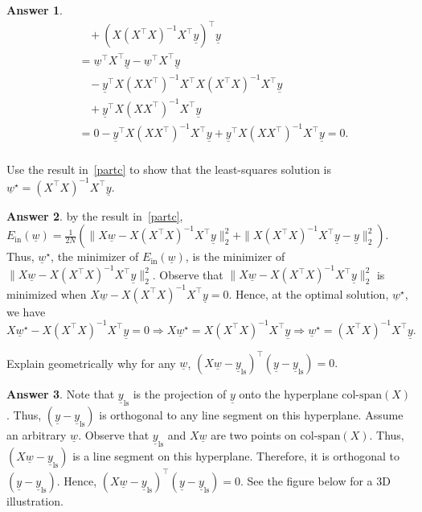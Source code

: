 \documentclass{article}
\renewcommand{\vec}[1]{\underline{#1}}
\newcommand{\vecw}{\vec{w}}
\newcommand{\vecy}{\vec{y}}
\theoremstyle{definition}
\newtheorem*{answer}{Answer}
\begin{document}
\begin{question}[start=0]
\begin{question}
\begin{answer}
\begin{align*}
				&~~~~ + (X (X^\top X)^{-1} X^\top \vecy)^\top \underline{y}\\
				&= \underline{w}^\top X^\top \underline{y} - \underline{w}^\top X^\top \underline{y} \\
				&~~~~ - \vecy^\top X (X X^\top)^{-1} X^\top  X (X^\top X)^{-1} X^\top \vecy\\
				&~~~~ + \vecy^\top X (X X^\top)^{-1} X^\top  \underline{y}\\
				&= 0  - \vecy^\top X (X X^\top)^{-1} X^\top \vecy  + \vecy^\top X (X X^\top)^{-1} X^\top  \underline{y}=0.\\
			\end{align*}
		\end{answer}
	\item Use the result in~\ref{partc} to show that the least-squares solution is $\vecw^\star = (X^\top X)^{-1} X^\top \vecy$. 
	\begin{answer}
		by the result in~\ref{partc}, $E_{\text{in}}(\vecw) = \frac{1}{2N} \left(\|X \underline{w} - X (X^\top X)^{-1} X^\top \vecy\|_{2}^2 + \|X (X^\top X)^{-1} X^\top \vecy - \underline{y}\|_{2}^2\right)$. Thus, $\underline{w}^\star$, the minimizer of $E_{\text{in}}(\vecw)$, is the minimizer of $\|X \underline{w} - X (X^\top X)^{-1} X^\top \vecy\|_{2}^2$. Observe that $\|X \underline{w} - X (X^\top X)^{-1} X^\top \vecy\|_{2}^2$ is minimized when $X \underline{w} - X (X^\top X)^{-1} X^\top \vecy=0$. Hence, at the optimal solution, $\underline{w}^\star$, we have
		\begin{equation*}
			X \underline{w}^\star - X (X^\top X)^{-1} X^\top \vecy = 0 \Rightarrow X \underline{w}^\star = X (X^\top X)^{-1} X^\top \vecy \Rightarrow \underline{w}^\star = (X^\top X)^{-1} X^\top \vecy.
		\end{equation*}
	\end{answer}
	\item Explain geometrically why for any $\underline{w}$, $(X \vecw - \vecy_{\text{ls}})^\top (\vecy - \vecy_{\text{ls}}) = 0.$
	\begin{answer}
		Note that $\vecy_{\text{ls}}$ is the projection of $\vecy$ onto the hyperplane $\text{col-span}{(X)}$. Thus, $(\vecy - \vecy_{\text{ls}})$ is orthogonal to any line segment on this hyperplane. Assume an arbitrary $\vecw$. Observe that $\vecy_{\text{ls}}$ and $X \vecw$ are two points on $\text{col-span}{(X)}$. Thus, $(X \vecw - \vecy_{\text{ls}})$ is a line segment on this hyperplane. Therefore, it is orthogonal to $(\vecy - \vecy_{\text{ls}})$. Hence, $(X \vecw - \vecy_{\text{ls}})^\top (\vecy - \vecy_{\text{ls}}) = 0$. See the figure below for a 3D illustration.

\end{answer}
\end{question}
\end{question}
\end{document}
